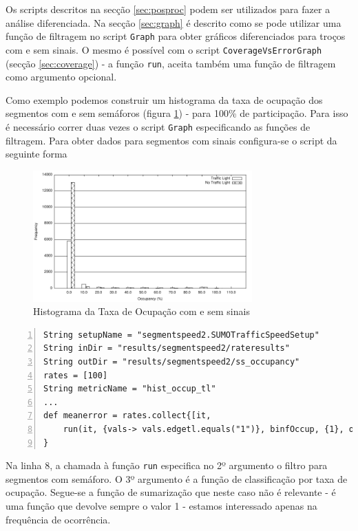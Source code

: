 \documentclass{article}
\newcommand{\tm}[1]{\texttt{#1}}
\begin{document}
Os scripts descritos na secção \ref{sec:posproc} podem ser utilizados para fazer a análise diferenciada. Na secção \ref{sec:graph} é descrito como se pode utilizar uma função de filtragem no script \tm{Graph} para obter gráficos diferenciados para troços com e sem sinais. O mesmo é possível  com o script \tm{CoverageVsErrorGraph} (secção \ref{sec:coverage}) - a função \tm{run}, aceita também uma função de filtragem como argumento opcional.

Como exemplo podemos construir um histograma da taxa de ocupação dos segmentos com e sem semáforos (figura \ref{fig:hist-occup}) -  para 100\% de participação. Para isso é necessário correr duas vezes o script \tm{Graph} especificando as funções de filtragem. Para obter dados para segmentos com sinais configura-se o script da seguinte forma

\begin{figure}[h!]
	\centering
	\includegraphics[width=0.75\textwidth]{figs/ss_hist_occup.pdf}
	\caption{Histograma da Taxa de Ocupação com e sem sinais}
	\label{fig:hist-occup}
\end{figure}

\begin{Verbatim}[numbers=left]
String setupName = "segmentspeed2.SUMOTrafficSpeedSetup"
String inDir = "results/segmentspeed2/rateresults"
String outDir = "results/segmentspeed2/ss_occupancy"
rates = [100]
String metricName = "hist_occup_tl"
...
def meanerror = rates.collect{[it,
	run(it, {vals-> vals.edgetl.equals("1")}, binfOccup, {1}, outfStats )] 
}
\end{Verbatim}

Na linha 8, a chamada à função \tm{run} especifica no 2º argumento o filtro para segmentos com semáforo. O 3º argumento é a função de classificação por taxa de ocupação. Segue-se a função de sumarização que neste caso não é relevante - é uma função que devolve sempre o valor 1 - estamos interessado apenas na frequência de ocorrência.  
\end{document}

